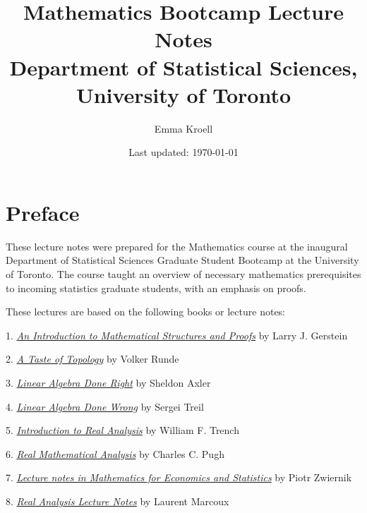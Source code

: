 \documentclass{article}
\title{Mathematics Bootcamp Lecture Notes \\
\vspace{0.5em}
\large Department of Statistical Sciences, University of Toronto}
\author{Emma Kroell}
\date{Last updated: \today}
\begin{document}
\maketitle


\newpage
\section*{Preface}

These lecture notes were prepared for the Mathematics course at the inaugural Department of Statistical Sciences Graduate Student Bootcamp at the University of Toronto. The course taught an overview of necessary mathematics prerequisites to incoming statistics graduate students, with an emphasis on proofs.

\vspace{1em}

These lectures are based on the following books or lecture notes:

\vspace{1em}

1. \href{https://link-springer-com.myaccess.library.utoronto.ca/book/10.1007/978-1-4614-4265-3}{{\emph{An Introduction to Mathematical Structures and Proofs}}} by Larry J. Gerstein

2. \href{https://link-springer-com.myaccess.library.utoronto.ca/book/10.1007/0-387-28387-0}{\emph{A Taste of Topology}} by Volker Runde

3. \href{https://link-springer-com.myaccess.library.utoronto.ca/book/10.1007/978-3-319-11080-6}{{\emph{Linear Algebra Done Right}}} by Sheldon Axler

4. \href{https://www.math.brown.edu/streil/papers/LADW/LADW.html}{{\emph{Linear Algebra Done Wrong}}} by Sergei Treil

5. \href{https://digitalcommons.trinity.edu/mono/7/}{{\emph{Introduction to Real Analysis}}} by William F. Trench

6. \href{https://link-springer-com.myaccess.library.utoronto.ca/book/10.1007/978-3-319-17771-7}{\emph{Real Mathematical Analysis}} by Charles C. Pugh

7. \href{http://84.89.132.1/~piotr/docs/RealAnalysisNotes.pdf}{\emph{Lecture notes in Mathematics for Economics and Statistics}} by Piotr Zwiernik

8. \href{http://www.math.uwaterloo.ca/~lwmarcou/notes/pmath351.pdf}{{\emph{Real Analysis Lecture Notes}}} by Laurent Marcoux

\vspace{1em}
\end{document}
